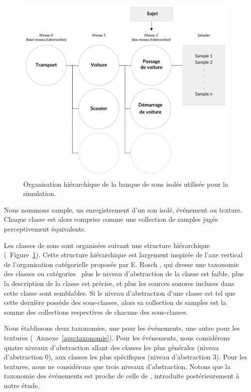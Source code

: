 \documentclass[twoside,twocolumn]{article}
\begin{document}
\begin{figure}[t]
        \myfloatalign
        \includegraphics[width=.8\linewidth]{gfx/ch_4/3}
       \caption{Organisation hiérarchique de la banque de sons isolés utilisée pour la simulation.}\label{fig:orgDb}
\end{figure}


Nous nommons sample, un enregistrement d'un son isolé, événement ou texture. Chaque classe est alors comprise comme une collection de samples jugés perceptivement équivalents.

Les classes de sons sont organisées suivant une structure hiérarchique (\cf~Figure~\ref{fig:orgDb}). Cette structure hiérarchique est largement inspirée de l'axe vertical de l'organisation catégorielle proposée par E. Rosch \cite{rosch1978cognition}, qui dresse une taxonomie des classes ou catégories \ie~plus le niveau d'abstraction de la classe est faible, plus la description de la classe est précise, et plus les sources sonores incluses dans cette classe sont semblables. Si le niveau d'abstraction d'une classe est tel que cette dernière possède des sous-classes, alors sa collection de samples est la somme des collections respectives de chacune des sous-classes.

Nous établissons deux taxonomies, une pour les événements, une autre pour les textures (\cf~Annexe~\ref{app:taxonomie}). Pour les événements, nous considérons quatre niveaux d'abstraction allant des classes les plus générales (niveau d'abstraction 0), aux classes les plus spécifiques (niveau d'abstraction 3). Pour les textures, nous ne considérons que trois niveaux d'abstraction. Notons que la taxonomie des événements est proche de celle de \cite{Salamon14}, introduite postérieurement à notre étude.
\end{document}
